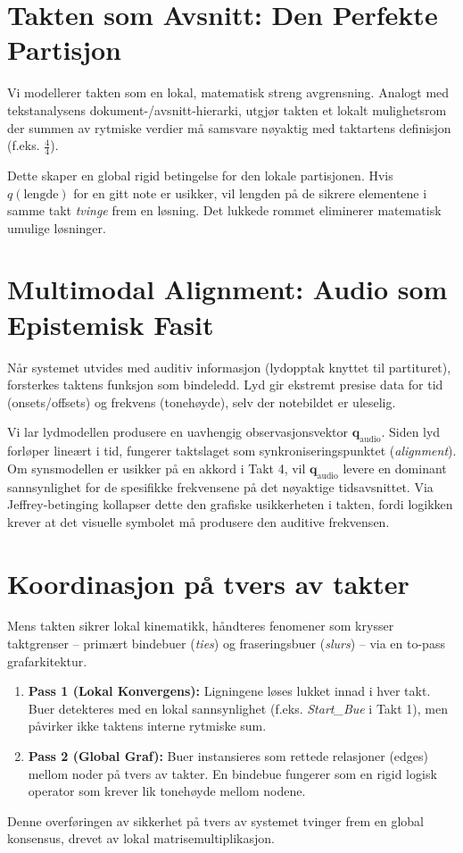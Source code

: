 \documentclass[11pt, a4paper]{article}
\begin{document}
\section{Takten som Avsnitt: Den Perfekte Partisjon}
Vi modellerer takten som en lokal, matematisk streng avgrensning. Analogt med tekstanalysens dokument-/avsnitt-hierarki, utgjør takten et lokalt mulighetsrom der summen av rytmiske verdier må samsvare nøyaktig med taktartens definisjon (f.eks. $\frac{4}{4}$).

Dette skaper en global rigid betingelse for den lokale partisjonen. Hvis $q(\text{lengde})$ for en gitt note er usikker, vil lengden på de sikrere elementene i samme takt \textit{tvinge} frem en løsning. Det lukkede rommet eliminerer matematisk umulige løsninger.

\section{Multimodal Alignment: Audio som Epistemisk Fasit}
Når systemet utvides med auditiv informasjon (lydopptak knyttet til partituret), forsterkes taktens funksjon som bindeledd. Lyd gir ekstremt presise data for tid (onsets/offsets) og frekvens (tonehøyde), selv der notebildet er uleselig.

Vi lar lydmodellen produsere en uavhengig observasjonsvektor $\mathbf{q}_{\text{audio}}$. Siden lyd forløper lineært i tid, fungerer taktslaget som synkroniseringspunktet (\textit{alignment}). Om synsmodellen er usikker på en akkord i Takt 4, vil $\mathbf{q}_{\text{audio}}$ levere en dominant sannsynlighet for de spesifikke frekvensene på det nøyaktige tidsavsnittet. Via Jeffrey-betinging kollapser dette den grafiske usikkerheten i takten, fordi logikken krever at det visuelle symbolet må produsere den auditive frekvensen.

\section{Koordinasjon på tvers av takter}
Mens takten sikrer lokal kinematikk, håndteres fenomener som krysser taktgrenser -- primært bindebuer (\textit{ties}) og fraseringsbuer (\textit{slurs}) -- via en to-pass grafarkitektur.

\begin{enumerate}
    \item \textbf{Pass 1 (Lokal Konvergens):} Ligningene løses lukket innad i hver takt. Buer detekteres med en lokal sannsynlighet (f.eks. \textit{Start\_Bue} i Takt 1), men påvirker ikke taktens interne rytmiske sum.
    \item \textbf{Pass 2 (Global Graf):} Buer instansieres som rettede relasjoner (edges) mellom noder på tvers av takter. En bindebue fungerer som en rigid logisk operator som krever lik tonehøyde mellom nodene.
\end{enumerate}

Denne overføringen av sikkerhet på tvers av systemet tvinger frem en global konsensus, drevet av lokal matrisemultiplikasjon.
\end{document}
